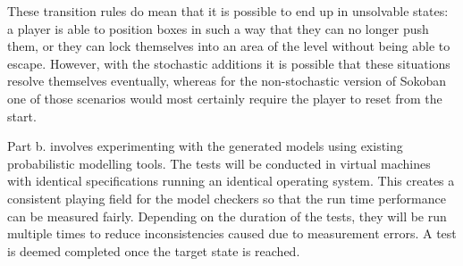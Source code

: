 These transition rules do mean that it is possible to end up in unsolvable states: a player is able to position boxes in such a way that they can no longer push them, or they can lock themselves into an area of the level without being able to escape. However, with the stochastic additions it is possible that these situations resolve themselves eventually, whereas for the non-stochastic version of Sokoban one of those scenarios would most certainly require the player to reset from the start.


Part b. involves experimenting with the generated models using existing probabilistic modelling tools. The tests will be conducted in virtual machines with identical specifications running an identical operating system. This creates a consistent playing field for the model checkers so that the run time performance can be measured fairly. Depending on the duration of the tests, they will be run multiple times to reduce inconsistencies caused due to measurement errors. A test is deemed completed once the target state is reached.






